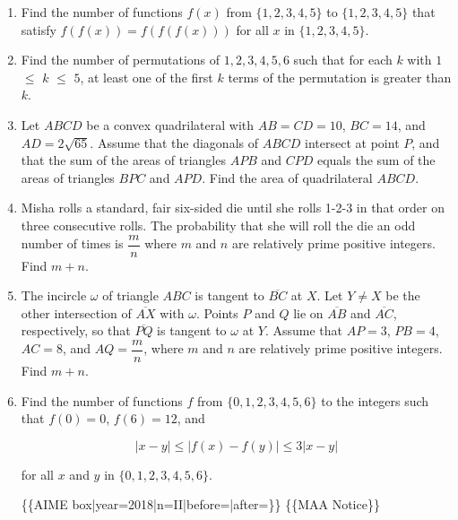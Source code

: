 \documentclass{article}
\begin{document}
\begin{enumerate}[label=\arabic*., itemsep=0.5em]
\par \vspace{0.5em}\item Find the number of functions \(f(x)\) from \(\{1, 2, 3, 4, 5\}\) to \(\{1, 2, 3, 4, 5\}\) that satisfy \(f(f(x)) = f(f(f(x)))\) for all \(x\) in \(\{1, 2, 3, 4, 5\}\).\par \vspace{0.5em}\item Find the number of permutations of \(1, 2, 3, 4, 5, 6\) such that for each \(k\) with \(1\) \(\leq\) \(k\) \(\leq\) \(5\), at least one of the first \(k\) terms of the permutation is greater than \(k\).\par \vspace{0.5em}\item Let \(ABCD\) be a convex quadrilateral with \(AB = CD = 10\), \(BC = 14\), and \(AD = 2\sqrt{65}\). Assume that the diagonals of \(ABCD\) intersect at point \(P\), and that the sum of the areas of triangles \(APB\) and \(CPD\) equals the sum of the areas of triangles \(BPC\) and \(APD\). Find the area of quadrilateral \(ABCD\).\par \vspace{0.5em}\item Misha rolls a standard, fair six-sided die until she rolls 1-2-3 in that order on three consecutive rolls. The probability that she will roll the die an odd number of times is \(\dfrac{m}{n}\) where \(m\) and \(n\) are relatively prime positive integers. Find \(m+n\).\par \vspace{0.5em}\item The incircle \(\omega\) of triangle \(ABC\) is tangent to \(\overline{BC}\) at \(X\). Let \(Y \neq X\) be the other intersection of \(\overline{AX}\) with \(\omega\). Points \(P\) and \(Q\) lie on \(\overline{AB}\) and \(\overline{AC}\), respectively, so that \(\overline{PQ}\) is tangent to \(\omega\) at \(Y\). Assume that \(AP = 3\), \(PB = 4\), \(AC = 8\), and \(AQ = \dfrac{m}{n}\), where \(m\) and \(n\) are relatively prime positive integers. Find \(m+n\).\par \vspace{0.5em}\item Find the number of functions \(f\) from \(\{0, 1, 2, 3, 4, 5, 6\}\) to the integers such that \(f(0) = 0\), \(f(6) = 12\), and


\begin{equation*}
|x - y|  \leq  |f(x) - f(y)|  \leq  3|x - y|
\end{equation*}


for all \(x\) and \(y\) in \(\{0, 1, 2, 3, 4, 5, 6\}\).



\{\{AIME box|year=2018|n=II|before=|after=\}\}
\{\{MAA Notice\}\}\par \vspace{0.5em}
\end{enumerate}
\end{document}
